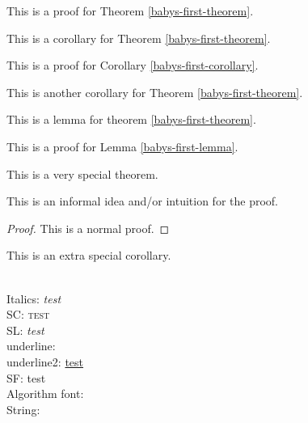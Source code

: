 \documentclass{article}
\begin{document}
\begin{solution}
\begin{theorem}
    \end{theorem}
    \begin{theoremproof}
        This is a proof for Theorem \ref{babys-first-theorem}.
    \end{theoremproof}
    \begin{corollary} \label{babys-first-corollary}
        This is a corollary for Theorem \ref{babys-first-theorem}.
    \end{corollary}
    \begin{corollaryproof}
        This is a proof for Corollary \ref{babys-first-corollary}.
    \end{corollaryproof}
    \begin{corollary} 
        This is another corollary for Theorem \ref{babys-first-theorem}.
    \end{corollary}
    \begin{lemma} \label{babys-first-lemma}
        This is a lemma for theorem \ref{babys-first-theorem}.
    \end{lemma}
    \begin{lemmaproof}
        This is a proof for Lemma \ref{babys-first-lemma}.
    \end{lemmaproof}
    
    \begin{theorem}
        This is a very special theorem.
    \end{theorem}
    \begin{proofsketch}
        This is an informal idea and/or intuition for the proof.
    \end{proofsketch}
    \begin{proof}
        This is a normal proof.
    \end{proof}
    \begin{corollary}
        This is an extra special corollary.
    \end{corollary}
    
    \\
    Italics: \textit{test}\\
    SC: \textsc{test}\\
    SL: \textsl{test}\\
    underline: \\
    underline2: \underline{test}\\
    SF: \textsf{test}\\
    Algorithm font: \\
    String: \\
    
\end{solution}
\end{document}
